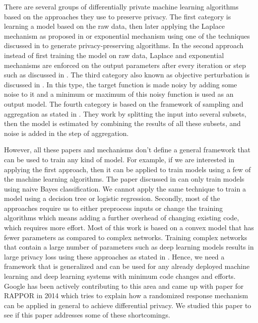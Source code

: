 There are several groups of differentially private machine learning algorithms based on the approaches they use to preserve privacy. The first category is learning a model based on the raw data, then later applying the Laplace mechanism as proposed in \cite{26} \cite{27} \cite{28} \cite{29} \cite{30} or exponential mechanism using one of the techniques discussed in \cite{31} \cite{32} to generate privacy-preserving algorithms. In the second approach instead of first training the model on raw data, Laplace and exponential mechanisms are enforced on the output parameters after every iteration or step such as discussed in \cite{33} \cite{34} \cite{35} \cite{36} \cite{37} \cite{38} \cite{39}. The third category also known as objective perturbation is discussed in \cite{40} \cite{41} \cite{42} \cite{43}. In this type, the target function is made noisy by adding some noise to it and a minimum or maximum of this noisy function is used as an output model. The fourth category is based on the framework of sampling and aggregation as stated in \cite{44} \cite{45}. They work by splitting the input into several subsets, then the model is estimated by combining the results of all these subsets, and noise is added in the step of aggregation. 

However, all these papers and mechanisms don't define a general framework that can be used to train any kind of model. For example, if we are interested in applying the first approach, then it can be applied to train models using a few of the machine learning algorithms. The paper discussed in \cite{26} can only train models using naive Bayes classification. We cannot apply the same technique to train a model using a decision tree or logistic regression. Secondly, most of the approaches require us to either preprocess inputs or change the training algorithms which means adding a further overhead of changing existing code, which requires more effort. Most of this work is based on a convex model that has fewer parameters as compared to complex networks. Training complex networks that contain a large number of parameters such as deep learning models results in large privacy loss using these approaches as stated in \cite{4}. Hence, we need a framework that is generalized and can be used for any already deployed machine learning and deep learning systems with minimum code changes and efforts. Google has been actively contributing to this area and came up with paper for RAPPOR \cite{5} in 2014 which tries to explain how a randomized response mechanism can be applied in general to achieve differential privacy. We studied this paper to see if this paper addresses some of these shortcomings.

